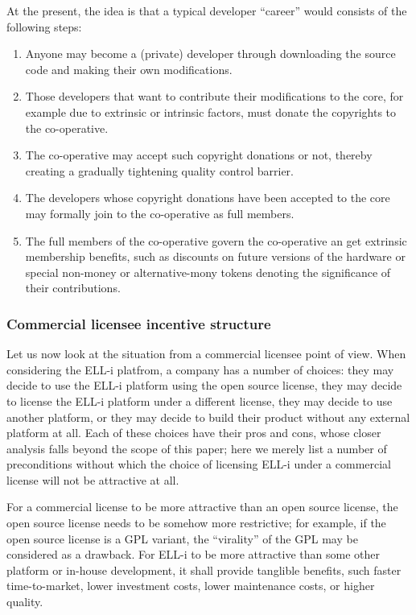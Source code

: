 \documentclass[draft,a4paper]{siamltex}
\begin{document}
At the present, the idea is that a typical developer ``career'' would
consists of the following steps:
\begin{enumerate}
  \item Anyone may become a (private) developer through downloading
    the source code and making their own modifications.
  \item Those developers that want to contribute their modifications
    to the core, for example due to extrinsic or intrinsic factors,
    must donate the copyrights to the co-operative.
  \item The co-operative may accept such copyright donations or not,
    thereby creating a gradually tightening quality control barrier.
  \item The developers whose copyright donations have been accepted to
    the core may formally join to the co-operative as full members.
  \item The full members of the co-operative govern the co-operative
    an get extrinsic membership benefits, such as discounts on future
    versions of the hardware or special non-money or alternative-mony
    tokens denoting the significance of their contributions.
\end{enumerate}

\subsubsection{Commercial licensee incentive structure}

Let us now look at the situation from a commercial licensee point of
view.  When considering the ELL-i platfrom, a company has a number of
choices: they may decide to use the ELL-i platform using the open
source license, they may decide to license the ELL-i platform under a
different license, they may decide to use another platform, or they
may decide to build their product without any external platform at
all.  Each of these choices have their pros and cons, whose closer
analysis falls beyond the scope of this paper; here we merely list a
number of preconditions without which the choice of licensing ELL-i
under a commercial license will not be attractive at all.

For a commercial license to be more attractive than an open source
license, the open source license needs to be somehow more restrictive;
for example, if the open source license is a GPL variant, the
``virality'' of the GPL may be considered as a drawback.  For ELL-i to
be more attractive than some other platform or in-house development,
it shall provide tanglible benefits, such faster time-to-market,
lower investment costs, lower maintenance costs, or higher quality.
\end{document}
